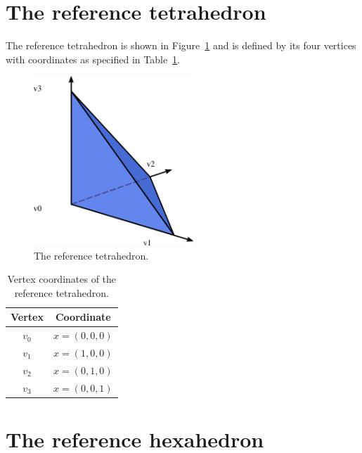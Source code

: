 \section{The reference tetrahedron}

The reference tetrahedron is shown in Figure~\ref{fig:tetrahedron} and
is defined by its four vertices with coordinates as specified in
Table~\ref{tab:tetrahedron,vertices}.

\begin{figure}
  \begin{center}
    \includegraphics[width=6cm]{eps/tetrahedron.eps}
    \caption{The reference tetrahedron.}
    \label{fig:tetrahedron}
  \end{center}
\end{figure}

\begin{table}
\linespread{1.2}\selectfont
  \begin{center}
    \begin{tabular}{|c|c|}
      \hline
      Vertex & Coordinate \\
      \hline
      \hline
      $v_0$ & $x = (0, 0, 0)$ \\
      \hline
      $v_1$ & $x = (1, 0, 0)$ \\
      \hline
      $v_2$ & $x = (0, 1, 0)$ \\
      \hline
      $v_3$ & $x = (0, 0, 1)$ \\
      \hline
    \end{tabular}
    \caption{Vertex coordinates of the reference tetrahedron.}
    \label{tab:tetrahedron,vertices}
  \end{center}
\end{table}

\section{The reference hexahedron}

